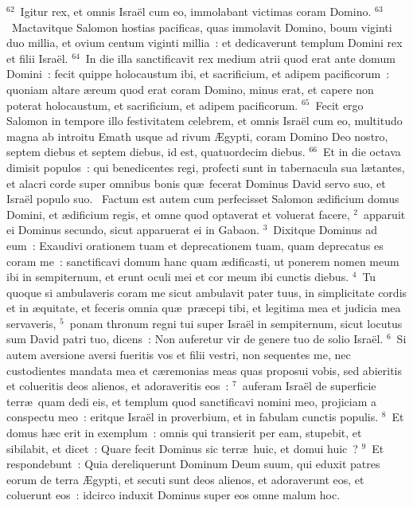 ${}^{62}$~Igitur rex, et omnis Isra\"el cum eo, immolabant victimas coram Domino.
${}^{63}$~Mactavitque Salomon hostias pacificas, quas immolavit Domino, boum viginti duo millia, et ovium centum viginti millia~: et dedicaverunt templum Domini rex et filii Isra\"el.
${}^{64}$~In die illa sanctificavit rex medium atrii quod erat ante domum Domini~: fecit quippe holocaustum ibi, et sacrificium, et adipem pacificorum~: quoniam altare \ae reum quod erat coram Domino, minus erat, et capere non poterat holocaustum, et sacrificium, et adipem pacificorum.
${}^{65}$~Fecit ergo Salomon in tempore illo festivitatem celebrem, et omnis Isra\"el cum eo, multitudo magna ab introitu Emath usque ad rivum \AE gypti, coram Domino Deo nostro, septem diebus et septem diebus, id est, quatuordecim diebus.
${}^{66}$~Et in die octava dimisit populos~: qui benedicentes regi, profecti sunt in tabernacula sua l\ae tantes, et alacri corde super omnibus bonis qu\ae\ fecerat Dominus David servo suo, et Isra\"el populo suo.
~\lettrine[lines=10,image=true,loversize=0.05,lraise=-0.03]{F}{}actum est autem cum perfecisset Salomon \ae dificium domus Domini, et \ae dificium regis, et omne quod optaverat et voluerat facere,
${}^{2}$~apparuit ei Dominus secundo, sicut apparuerat ei in Gabaon.
${}^{3}$~Dixitque Dominus ad eum~: Exaudivi orationem tuam et deprecationem tuam, quam deprecatus es coram me~: sanctificavi domum hanc quam \ae dificasti, ut ponerem nomen meum ibi in sempiternum, et erunt oculi mei et cor meum ibi cunctis diebus.
${}^{4}$~Tu quoque si ambulaveris coram me sicut ambulavit pater tuus, in simplicitate cordis et in \ae quitate, et feceris omnia qu\ae\ pr\ae cepi tibi, et legitima mea et judicia mea servaveris,
${}^{5}$~ponam thronum regni tui super Isra\"el in sempiternum, sicut locutus sum David patri tuo, dicens~: Non auferetur vir de genere tuo de solio Isra\"el.
${}^{6}$~Si autem aversione aversi fueritis vos et filii vestri, non sequentes me, nec custodientes mandata mea et c\ae remonias meas quas proposui vobis, sed abieritis et colueritis deos alienos, et adoraveritis eos~:
${}^{7}$~auferam Isra\"el de superficie terr\ae\ quam dedi eis, et templum quod sanctificavi nomini meo, projiciam a conspectu meo~: eritque Isra\"el in proverbium, et in fabulam cunctis populis.
${}^{8}$~Et domus h\ae c erit in exemplum~: omnis qui transierit per eam, stupebit, et sibilabit, et dicet~: Quare fecit Dominus sic terr\ae\ huic, et domui huic~?
${}^{9}$~Et respondebunt~: Quia dereliquerunt Dominum Deum suum, qui eduxit patres eorum de terra \AE gypti, et secuti sunt deos alienos, et adoraverunt eos, et coluerunt eos~: idcirco induxit Dominus super eos omne malum hoc.



